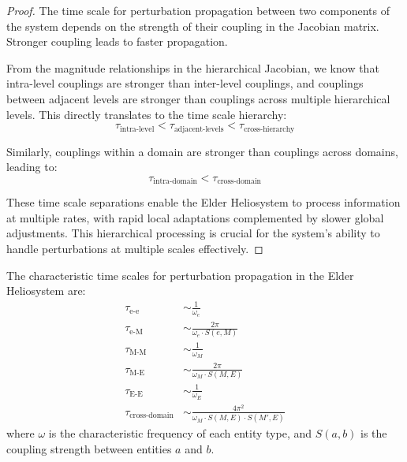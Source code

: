 \begin{proof}
The time scale for perturbation propagation between two components of the system depends on the strength of their coupling in the Jacobian matrix. Stronger coupling leads to faster propagation.

From the magnitude relationships in the hierarchical Jacobian, we know that intra-level couplings are stronger than inter-level couplings, and couplings between adjacent levels are stronger than couplings across multiple hierarchical levels. This directly translates to the time scale hierarchy:
\begin{equation}
\tau_{\text{intra-level}} < \tau_{\text{adjacent-levels}} < \tau_{\text{cross-hierarchy}}
\end{equation}

Similarly, couplings within a domain are stronger than couplings across domains, leading to:
\begin{equation}
\tau_{\text{intra-domain}} < \tau_{\text{cross-domain}}
\end{equation}

These time scale separations enable the Elder Heliosystem to process information at multiple rates, with rapid local adaptations complemented by slower global adjustments. This hierarchical processing is crucial for the system's ability to handle perturbations at multiple scales effectively.
\end{proof}

\begin{theorem}
The characteristic time scales for perturbation propagation in the Elder Heliosystem are:
\begin{align}
\tau_{\text{e-e}} &\sim \frac{1}{\omega_e} \\
\tau_{\text{e-M}} &\sim \frac{2\pi}{\omega_e \cdot S(e,M)} \\
\tau_{\text{M-M}} &\sim \frac{1}{\omega_M} \\
\tau_{\text{M-E}} &\sim \frac{2\pi}{\omega_M \cdot S(M,E)} \\
\tau_{\text{E-E}} &\sim \frac{1}{\omega_E} \\
\tau_{\text{cross-domain}} &\sim \frac{4\pi^2}{\omega_M \cdot S(M,E) \cdot S(M',E)}
\end{align}
where $\omega$ is the characteristic frequency of each entity type, and $S(a,b)$ is the coupling strength between entities $a$ and $b$.
\end{theorem}

